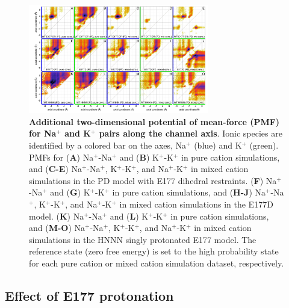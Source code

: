 \begin{refsection}
\begin{figure}[!ptb]
\centering
\includegraphics[width=0.7\textwidth]{nav2/Nav2FigS7-5}
\caption[Additional two-dimensional potential of mean-force (PMF) for Na$^+$ and K$^+$ pairs along the channel axis]{\textbf{Additional two-dimensional potential of mean-force (PMF) for Na$^+$ and K$^+$ pairs along the channel axis}. Ionic species are identified by a colored bar on the axes, Na$^+$ (blue) and K$^+$ (green). PMFs for (\textbf{A}) Na$^+$-Na$^+$ and (\textbf{B}) K$^+$-K$^+$ in pure cation simulations, and (\textbf{C-E}) Na$^+$-Na$^+$, K$^+$-K$^+$, and Na$^+$-K$^+$ in mixed cation simulations in the PD model with E177 dihedral restraints. (\textbf{F}) Na$^+$-Na$^+$ and (\textbf{G}) K$^+$-K$^+$ in pure cation simulations, and (\textbf{H-J}) Na$^+$-Na$^+$, K$^+$-K$^+$, and Na$^+$-K$^+$ in mixed cation simulations in the E177D model. (\textbf{K}) Na$^+$-Na$^+$ and (\textbf{L}) K$^+$-K$^+$ in pure cation simulations, and (\textbf{M-O}) Na$^+$-Na$^+$, K$^+$-K$^+$, and Na$^+$-K$^+$ in mixed cation simulations in the HNNN singly protonated E177 model. The reference state (zero free energy) is set to the high probability state for each pure cation or mixed cation simulation dataset, respectively.}
\label{fig:nav2figS7-5}
\end{figure}

\subsection{Effect of E177 protonation}


\end{refsection}

